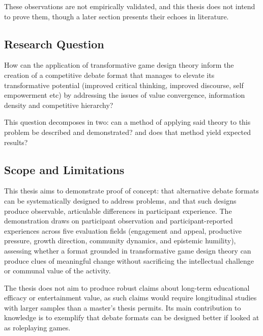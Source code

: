 These observations are not empirically validated, and this thesis does not intend to prove them, though a later section presents their echoes in literature.

\subsection{Research Question}

How can the application of transformative game design theory inform the creation of a competitive debate format that manages to elevate its transformative potential (improved critical thinking, improved discourse, self empowerment etc) by addressing the issues of value convergence, information density and competitive hierarchy?

This question decomposes in two: can a method of applying said theory to this problem be described and demonstrated? and does that method yield expected results?

\subsection{Scope and Limitations}

This thesis aims to demonstrate proof of concept: that alternative debate formats can be systematically designed to address problems, and that such designs produce observable, articulable differences in participant experience. The demonstration draws on participant observation and participant-reported experiences across five evaluation fields (engagement and appeal, productive pressure, growth direction, community dynamics, and epistemic humility), assessing whether a format grounded in transformative game design theory can produce clues of meaningful change without sacrificing the intellectual challenge or communal value of the activity.

The thesis does not aim to produce robust claims about long-term educational efficacy or entertainment value, as such claims would require longitudinal studies with larger samples than a master's thesis permits. Its main contribution to knowledge is to exemplify that debate formats can be designed better if looked at as roleplaying games.
